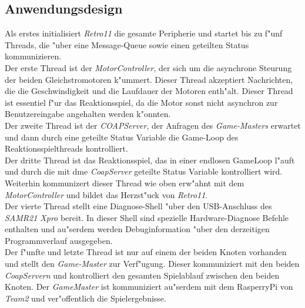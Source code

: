 \documentclass[a4paper]{article}
\begin{document}
  \subsection{Anwendungsdesign}
    \label{sec:retro11_design}
    Als erstes initialisiert \textit{Retro11} die gesamte Peripherie und
    startet bis zu f"unf Threads, die "uber eine Message-Queue sowie einen
    geteilten Status kommunizieren.\\
    Der erste Thread ist der \textit{MotorController}, der sich um die
    asynchrone Steurung der beiden Gleichstromotoren k"ummert. Dieser Thread
    akzeptiert Nachrichten, die die Geschwindigkeit und die Laufdauer der
    Motoren enth"alt. Dieser Thread ist essentiel f"ur das Reaktionsspiel, da
    die Motor sonst nicht asynchron zur Benutzereingabe angehalten werden
    k"onnten.\\
    Der zweite Thread ist der \textit{COAPServer}, der Anfragen des
    \textit{Game-Masters} erwartet und dann durch eine geteilte Status Variable
    die Game-Loop des Reaktionsspielthreads kontrolliert.\\
    Der dritte Thread ist das Reaktionsspiel, das in einer endlosen GameLoop
    l"auft und durch die mit dme \textit{CoapServer} geteilte Status Variable
    kontrolliert wird. Weiterhin kommunizert dieser Thread wie oben erw"ahnt
    mit dem \textit{MotorController} und bildet das Herzst"uck von
    \textit{Retro11}.\\
    Der vierte Thread stellt eine Diagnose-Shell "uber den USB-Anschluss des
    \textit{SAMR21 Xpro} bereit. In dieser Shell sind spezielle
    Hardware-Diagnose Befehle enthalten und au"serdem werden Debuginformation
    "uber den derzeitigen Programmverlauf ausgegeben.\\
    Der f"unfte und letzte Thread ist nur auf einem der beiden Knoten vorhanden
    und stellt den \textit{Game-Master} zur Verf"ugung. Dieser kommuniziert mit
    den beiden \textit{CoapServern} und kontrolliert den gesamten Spielablauf
    zwischen den beiden Knoten. Der \textit{GameMaster} ist kommuniziert
    au"serdem mit dem RasperryPi von \textit{Team2} und ver"offentlich die
    Spielergebnisse.
\end{document}
